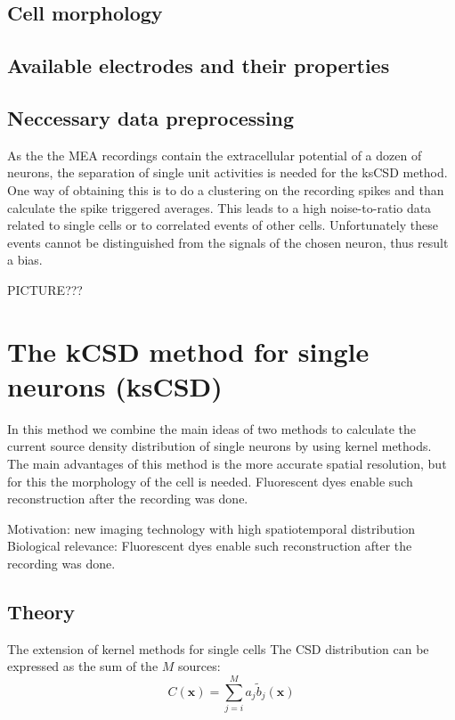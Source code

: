 \documentclass[12pt,a4paper]{article}
\begin{document}
\subsection{Cell morphology}

\subsection{Available electrodes and their properties}
\subsection{Neccessary data preprocessing }
As the the MEA recordings contain the extracellular potential of a dozen of neurons, the separation of single unit activities is needed for the ksCSD method. One way of obtaining this is to do a clustering on the recording spikes and than calculate the spike triggered averages. This leads to a high noise-to-ratio data related to single cells or to correlated events of other cells. Unfortunately  these events cannot be distinguished from the signals of the chosen neuron, thus result a bias.

PICTURE???

\section{The  kCSD method for single neurons (ksCSD)}
In this method we combine the main ideas of two methods to calculate the current source density distribution of single neurons \cite{Soma} by using kernel methods\cite{DanielW}. The main advantages of this method is the more accurate spatial resolution, but for this the morphology of the cell is needed. Fluorescent dyes enable such reconstruction after the recording was done. 


Motivation: new imaging technology with high spatiotemporal distribution
Biological relevance:   Fluorescent dyes enable such reconstruction after the recording was done.



\subsection{Theory}
The extension of kernel methods for single cells
The CSD distribution can be expressed as the sum of the $M$ sources: 
\begin{equation}
C (\textbf{x})= \sum_{j=i}^M a_j \tilde{b}_j(\textbf{x})
\end{equation}
\end{document}
